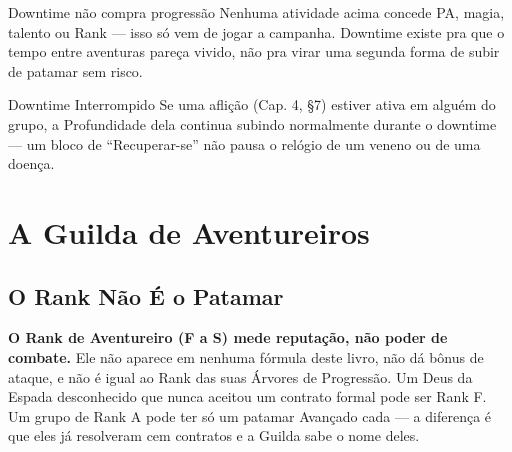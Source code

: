 \begin{aviso}{Downtime não compra progressão}
    Nenhuma atividade acima concede PA, magia, talento ou Rank --- isso só vem de jogar a
    campanha. Downtime existe pra que o tempo entre aventuras pareça vivido, não pra virar
    uma segunda forma de subir de patamar sem risco.
\end{aviso}

\begin{nota}{Downtime Interrompido}
    Se uma aflição (Cap. 4, §7) estiver ativa em alguém do grupo, a Profundidade dela
    continua subindo normalmente durante o downtime --- um bloco de \enquote{Recuperar-se}
    não pausa o relógio de um veneno ou de uma doença.
\end{nota}

\section{A Guilda de Aventureiros}

\subsection{O Rank Não É o Patamar}

\textbf{O Rank de Aventureiro (F a S) mede reputação, não poder de combate.} Ele não aparece
em nenhuma fórmula deste livro, não dá bônus de ataque, e não é igual ao Rank das suas
Árvores de Progressão. Um Deus da Espada desconhecido que nunca aceitou um contrato formal
pode ser Rank F. Um grupo de Rank A pode ter só um patamar Avançado cada --- a diferença é
que eles já resolveram cem contratos e a Guilda sabe o nome deles.


